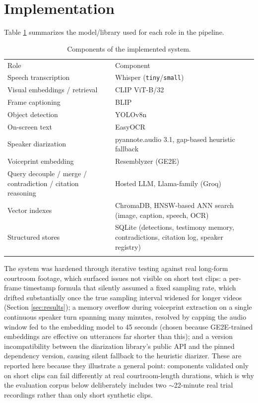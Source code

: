 \documentclass[3p,times,procedia]{elsarticle}
\begin{document}
\section{Implementation}
\label{sec:impl}

Table \ref{tab:stack} summarizes the model/library used for each role in the pipeline.

\begin{table}[h]
\caption{Components of the implemented system.}
\label{tab:stack}
\begin{tabular*}{\hsize}{@{\extracolsep{\fill}}ll@{}}
\toprule
Role & Component \\
\colrule
Speech transcription & Whisper (\texttt{tiny}/\texttt{small}) \\
Visual embeddings / retrieval & CLIP ViT-B/32 \\
Frame captioning & BLIP \\
Object detection & YOLOv8n \cite{redmon2016, jocher2023} \\
On-screen text & EasyOCR \\
Speaker diarization & pyannote.audio 3.1, gap-based heuristic fallback \cite{bredin2020} \\
Voiceprint embedding & Resemblyzer (GE2E) \cite{wan2018} \\
Query decouple / merge / contradiction / citation reasoning & Hosted LLM, Llama-family \cite{touvron2024llama3} (Groq) \\
Vector indexes & ChromaDB, HNSW-based ANN search \cite{malkov2020hnsw} (image, caption, speech, OCR) \\
Structured stores & SQLite (detections, testimony memory, contradictions, citation log, speaker registry) \\
\botrule
\end{tabular*}
\end{table}

The system was hardened through iterative testing against real long-form courtroom
footage, which surfaced issues not visible on short test clips: a per-frame timestamp
formula that silently assumed a fixed sampling rate, which drifted substantially once
the true sampling interval widened for longer videos (Section \ref{sec:results});
a memory overflow during voiceprint extraction on a single continuous speaker turn
spanning many minutes, resolved by capping the audio window fed to the embedding model
to 45 seconds (chosen because GE2E-trained embeddings are effective on utterances far
shorter than this); and a version incompatibility between the diarization library's
public API and the pinned dependency version, causing silent fallback to the
heuristic diarizer. These are reported here because they illustrate a general point:
components validated only on short clips can fail differently at real courtroom-length
durations, which is why the evaluation corpus below deliberately includes two
$\sim$22-minute real trial recordings rather than only short synthetic clips.
\end{document}
